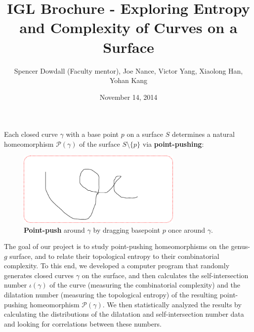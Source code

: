 \documentclass{article}
\begin{document}
\title{{\Large IGL Brochure - Exploring Entropy and Complexity of Curves on a Surface}}
\author{Spencer Dowdall (Faculty mentor),
	Joe Nance,
	Victor Yang,
	Xiaolong Han,
	Yohan Kang}
\date{November 14, 2014}
\maketitle

Each closed curve $\gamma$ with a base point $p$ on a surface $S$ determines a natural homeomorphism $\mathcal{P}(\gamma)$ of the surface $S\setminus\{p\}$ via \textbf{point-pushing}:
\begin{figure}[h]
\begin{center}
\includegraphics[width=8cm]{brochure--placeholder_picture}
\caption{{\bf Point-push} around $\gamma$ by dragging basepoint $p$ once around $\gamma$.}
\end{center}
\end{figure}

The goal of our project is to study point-pushing homeomorphisms on the genus-$g$ surface, and to relate their topological entropy to their combinatorial complexity. To this end, we developed a computer program that 
randomly generates closed curves $\gamma$ on the surface, and then calculates the self-intersection number $\iota(\gamma)$ of the curve (measuring the combinatorial complexity) and the dilatation number (measuring the topological entropy) of the resulting point-pushing homeomorphism $\mathcal{P}(\gamma)$. We then statistically analyzed the results by calculating the distributions of the dilatation and self-intersection number data and looking for correlations between these numbers.
\end{document}
